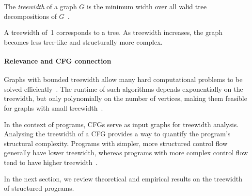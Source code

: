 \begin{definition}[Treewidth]
The \emph{treewidth} of a graph $G$ is the minimum width over all valid tree decompositions of $G$~\cite{robertson_1986}.
\end{definition}

\noindent A treewidth of~1 corresponds to a tree.
As treewidth increases, the graph becomes less tree-like and structurally more complex.

\paragraph{Relevance and CFG connection}
Graphs with bounded treewidth allow many hard computational problems to be solved efficiently~\cite{thorup_1998}.
The runtime of such algorithms depends exponentially on the treewidth, but only polynomially on the number of vertices, making them feasible for graphs with small treewidth~\cite{bodlaender_1988}.

In the context of programs, CFGs serve as input graphs for treewidth analysis.
Analysing the treewidth of a CFG provides a way to quantify the program's structural complexity.
Programs with simpler, more structured control flow generally have lower treewidth, whereas programs with more complex control flow tend to have higher treewidth~\cite{thorup_1998}.

In the next section, we review theoretical and empirical results on the treewidth of structured programs.
